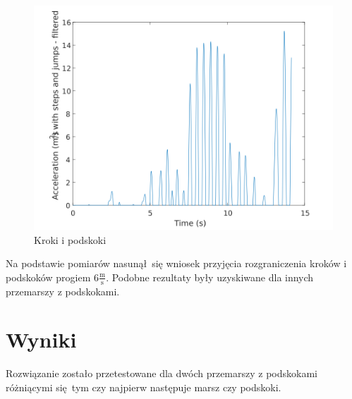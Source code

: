 \documentclass[a4paper, 12pt, titlepage]{article}
\begin{document}
        \begin{figure}[H]
            \centering
            \includegraphics[width=0.8\columnwidth]
                {krok_dziala1a.png}
            \caption{Kroki i podskoki}
        \end{figure}\noindent
        Na podstawie pomiarów nasunął się wniosek przyjęcia
        rozgraniczenia kroków i podskoków progiem $6 \frac{
            \mathrm{m}}{\mathrm{s}}$. Podobne rezultaty były uzyskiwane
        dla innych przemarszy z podskokami.
        \newpage
    \section{Wyniki}
        Rozwiązanie zostało przetestowane dla dwóch przemarszy
        z podskokami różniącymi się tym czy najpierw następuje marsz
        czy podskoki.
\end{document}
